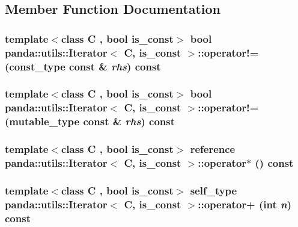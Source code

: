 \subsection{Member Function Documentation}
\hypertarget{classpanda_1_1utils_1_1Iterator_aaaa7b852e219a265c96ccd08a51071c7}{
\subsubsection[{operator!=}]{\setlength{\rightskip}{0pt plus 5cm}template$<$class C , bool is\_\-const$>$ bool {\bf panda::utils::Iterator}$<$ C, is\_\-const $>$::operator!= ({\bf const\_\-type} const \& {\em rhs}) const}}
\label{classpanda_1_1utils_1_1Iterator_aaaa7b852e219a265c96ccd08a51071c7}
\hypertarget{classpanda_1_1utils_1_1Iterator_a0d96dd11b07cd97aaccf304fb574d14b}{
\subsubsection[{operator!=}]{\setlength{\rightskip}{0pt plus 5cm}template$<$class C , bool is\_\-const$>$ bool {\bf panda::utils::Iterator}$<$ C, is\_\-const $>$::operator!= ({\bf mutable\_\-type} const \& {\em rhs}) const}}
\label{classpanda_1_1utils_1_1Iterator_a0d96dd11b07cd97aaccf304fb574d14b}
\hypertarget{classpanda_1_1utils_1_1Iterator_a045fa30b7902d62bd9c70d48abe4abdc}{
\subsubsection[{operator$\ast$}]{\setlength{\rightskip}{0pt plus 5cm}template$<$class C , bool is\_\-const$>$ {\bf reference} {\bf panda::utils::Iterator}$<$ C, is\_\-const $>$::operator$\ast$ () const}}
\label{classpanda_1_1utils_1_1Iterator_a045fa30b7902d62bd9c70d48abe4abdc}
\hypertarget{classpanda_1_1utils_1_1Iterator_a32ddcf2f54f2bb722cb62871759a6a84}{
\subsubsection[{operator+}]{\setlength{\rightskip}{0pt plus 5cm}template$<$class C , bool is\_\-const$>$ {\bf self\_\-type} {\bf panda::utils::Iterator}$<$ C, is\_\-const $>$::operator+ (int {\em n}) const}}

